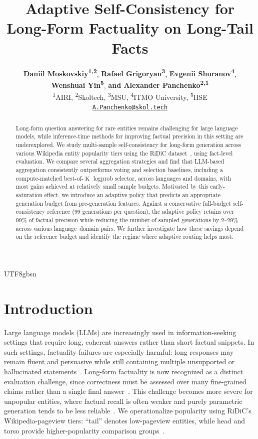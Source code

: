 \documentclass[11pt]{article}
\title{Adaptive Self-Consistency for Long-Form Factuality on Long-Tail Facts}
\author{\textbf{Daniil Moskovskiy\textsuperscript{1,2}}, \textbf{Rafael Grigoryan\textsuperscript{3}},
  \textbf{Evgenii Shuranov\textsuperscript{4}}, \\\textbf{Wenshuai Yin\textsuperscript{5}}, \textbf{and Alexander Panchenko\textsuperscript{2,1}} \\
  \textsuperscript{1}AIRI, \textsuperscript{2}Skoltech, \textsuperscript{3}MSU, \textsuperscript{4}ITMO University, \textsuperscript{5}HSE\\
  \texttt{\href{mailto:A.Panchenko@skol.tech}{A.Panchenko@skol.tech}}}
\begin{document}
\ifPDFTeX
  \begin{CJK*}{UTF8}{gbsn}
\fi
\maketitle
\begin{abstract}
Long-form question answering for rare entities remains challenging for large language models, while inference-time methods for improving factual precision in this setting are underexplored. We study multi-sample self-consistency for long-form generation across various Wikipedia entity popularity tiers using the RiDiC dataset~\citep{braslavski2026chroniclesridicgeneratingdatasets}, using fact-level evaluation. We compare several aggregation strategies and find that LLM-based aggregation consistently outperforms voting and selection baselines, including a compute-matched best-of-$\operatorname{K}$ logprob selector, across languages and domains, with most gains achieved at relatively small sample budgets. Motivated by this early-saturation effect, we introduce an adaptive policy that predicts an appropriate generation budget from pre-generation features. Against a conservative full-budget self-consistency reference (99 generations per question), the adaptive policy retains over 99\% of factual precision while reducing the number of sampled generations by 2--29\% across various language--domain pairs. We further investigate how these savings depend on the reference budget and identify the regime where adaptive routing helps most.
\end{abstract}

\section{Introduction}

Large language models (LLMs) are increasingly used in information-seeking settings that require long, coherent answers rather than short factual snippets. In such settings, factuality failures are especially harmful: long responses may remain fluent and persuasive while still containing multiple unsupported or hallucinated statements~\citep{DBLP:conf/acl/MaynezNBM20,DBLP:journals/csur/JiLFYSXIBMF23}. Long-form factuality is now recognized as a distinct evaluation challenge, since correctness must be assessed over many fine-grained claims rather than a single final answer~\citep{min-etal-2023-factscore,wildhallucinations,DBLP:conf/nips/WeiYSLH0TPLHDL24}. This challenge becomes more severe for unpopular entities, where factual recall is often weaker and purely parametric generation tends to be less reliable~\citep{popqa}. We operationalize popularity using RiDiC's Wikipedia-pageview tiers: ``tail'' denotes low-pageview entities, while head and torso provide higher-popularity comparison groups~\citep{braslavski2026chroniclesridicgeneratingdatasets}.


\end{CJK*}
\end{document}
